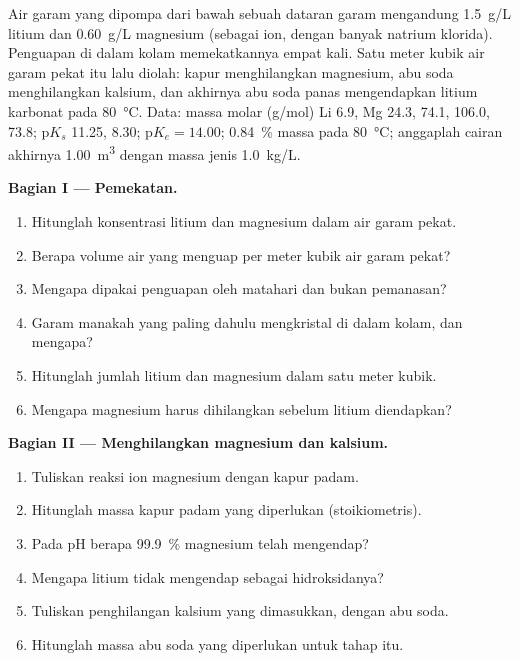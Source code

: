 \begin{problem}
\label{pb:b1:s-block:1}
Air garam yang dipompa dari bawah sebuah dataran garam mengandung
\qty{1.5}{g/L} litium dan \qty{0.60}{g/L} magnesium (sebagai ion, dengan
banyak natrium klorida). Penguapan di dalam kolam memekatkannya empat
kali. Satu meter kubik air garam pekat itu lalu diolah: kapur
menghilangkan magnesium, abu soda menghilangkan kalsium, dan akhirnya abu
soda panas mengendapkan litium karbonat pada \qty{80}{\celsius}. Data:
massa molar (\unit{g/mol}) Li 6.9, Mg 24.3,  74.1,
 106.0,  73.8; $\mathrm{p}K_s$  11.25,
 8.30; $\mathrm{p}K_e = 14.00$;  
\qty{0.84}{\percent} massa pada \qty{80}{\celsius}; anggaplah cairan
akhirnya \qty{1.00}{m^3} dengan massa jenis \qty{1.0}{kg/L}.

\medskip
\noindent\textbf{Bagian I --- Pemekatan.}
\begin{enumerate}
  \item Hitunglah konsentrasi litium dan magnesium dalam air garam pekat.
  \item Berapa volume air yang menguap per meter kubik air garam pekat?
  \item Mengapa dipakai penguapan oleh matahari dan bukan pemanasan?
  \item Garam manakah yang paling dahulu mengkristal di dalam kolam, dan
        mengapa?
  \item Hitunglah jumlah litium dan magnesium dalam satu meter kubik.
  \item Mengapa magnesium harus dihilangkan sebelum litium diendapkan?
\end{enumerate}

\medskip
\noindent\textbf{Bagian II --- Menghilangkan magnesium dan kalsium.}
\begin{enumerate}[resume]
  \item Tuliskan reaksi ion magnesium dengan kapur padam.
  \item Hitunglah massa kapur padam yang diperlukan (stoikiometris).
  \item Pada pH berapa \qty{99.9}{\percent} magnesium telah mengendap?
  \item Mengapa litium tidak mengendap sebagai hidroksidanya?
  \item Tuliskan penghilangan kalsium yang dimasukkan, dengan abu soda.
  \item Hitunglah massa abu soda yang diperlukan untuk tahap itu.
\end{enumerate}


\end{problem}
